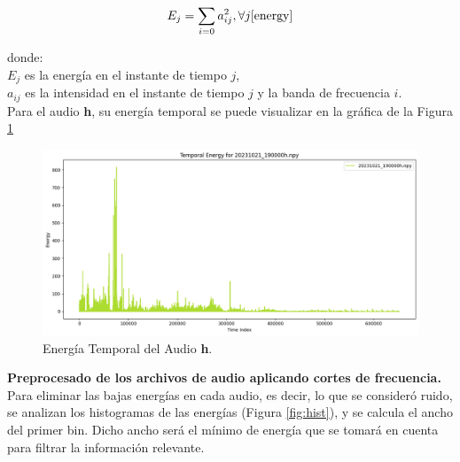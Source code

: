\documentclass[a4paper,10pt,twocolumn]{article}
\begin{document}
\begin{equation*}
	E_j = \sum_{i=0} a_{ij}^{2}, \forall j     \cite{energy}
\end{equation*} 


donde:\\
$E_j$ es la energía en el instante de tiempo $j$,\\
$a_{ij}$ es la intensidad en el instante de tiempo $j$ y la banda de frecuencia $i$.\\

Para el audio \textbf{h}, su energía temporal se puede visualizar en la gráfica de la Figura \ref{fig:energy}\\

\begin{figure}[h!]
    \centering
    \includegraphics[width=\columnwidth]{assets/temp_energy.png}
    \caption{Energía Temporal del Audio \textbf{h}.}
    \label{fig:energy}
\end{figure}


\textbf{Preprocesado de los archivos de audio aplicando cortes de frecuencia.}\\

Para eliminar las bajas energías en cada audio, es decir, lo que se consideró ruido, se analizan los histogramas de las energías (Figura \ref{fig:hist}),
y se calcula el ancho del primer bin. Dicho ancho será el mínimo de energía que se tomará en cuenta para filtrar la información relevante.\\
\end{document}
